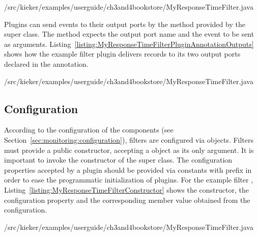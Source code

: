 \setJavaCodeListing
%
{\customComponentsBookstoreApplicationDir/src/kieker/examples/userguide/ch3and4bookstore/MyResponseTimeFilter.java}

\noindent Plugins can send events to their output ports by the  method %
provided by the super class. The method expects the output port name and %
the event to be sent as arguments. Listing~\ref{listing:MyResponseTimeFilterPluginAnnotationOutputs} %
shows how the example filter plugin  delivers records %
to its two output ports declared in the  annotation.

\setJavaCodeListing
%
{\customComponentsBookstoreApplicationDir/src/kieker/examples/userguide/ch3and4bookstore/MyResponseTimeFilter.java}

\subsection{Configuration}\label{sec:analysis:configuration}

\noindent According to the %
configuration of the \KiekerMonitoringPart{} components (see Section~\ref{sec:monitoring:configuration}), 
filters are configured via  objects. Filters must %
provide a public constructor, accepting a  object as %
its only argument. It is important to invoke the constructor of the super class. %
The configuration properties accepted by a plugin should be provided via  %
constants with prefix  in order to ease the %
programmatic initialization of plugins. For the example filter ,
Listing~\ref{listing:MyResponseTimeFilterConstructor} shows the constructor, 
the configuration property and the corresponding member value obtained from the configuration.

\setJavaCodeListing
%
{\customComponentsBookstoreApplicationDir/src/kieker/examples/userguide/ch3and4bookstore/MyResponseTimeFilter.java}

